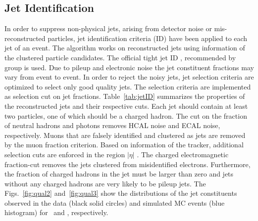 \subsection{Jet Identification}
In order to suppress non-physical jets, arising from detector noise or mis-reconstructed particles, jet identification criteria (ID) have been applied to each jet of an event. The algorithm works on reconstructed jets using information of the clustered particle candidates. The official tight jet ID \cite{CMS:2010xta}, recommended by \JetMet group \cite{JetID} is used. Due to pileup and electronic noise the jet constituent fractions may vary from event to event. In order to reject the noisy jets, jet selection criteria are optimized to select only good quality jets. The selection criteria are implemented as selection cut on jet fractions. Table~\ref{tab:jetID} summarizes the properties of the reconstructed jets and their respective cuts. Each jet should contain at least two particles, one of which should be a charged hadron. The cut on the fraction of neutral hadrons and photons removes HCAL noise and ECAL noise, respectively. Muons that are falsely identified and clustered as jets are removed by the muon fraction criterion. Based on information of the tracker, additional selection cuts are enforced in the region $|\eta|$ . The charged electromagnetic fraction-cut removes the jets clustered from misidentified electrons. Furthermore, the fraction of charged hadrons in the jet must be larger than zero and jets without any charged hadrons are very likely to be pileup jets. The Figs.~\ref{fig:qual2} and~\ref{fig:qual3} show the distributions of the jet constituents observed in the data (black solid circles) and simulated MC events (blue histogram) for \njt~and \njth, respectively.

